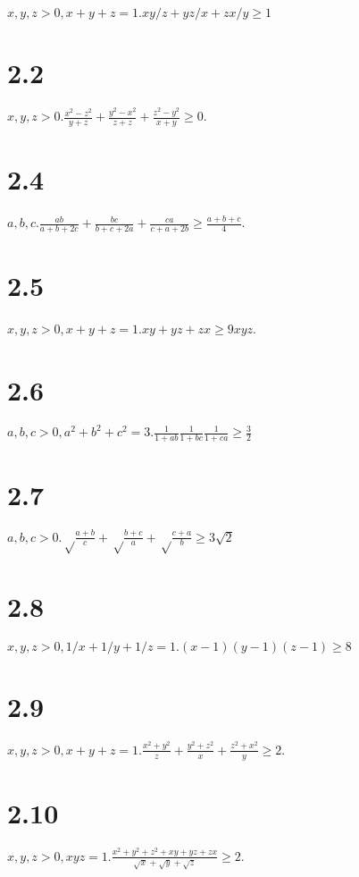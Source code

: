 \documentclass{article}
\begin{document}
$x, y, z > 0, x + y + z = 1. xy/z + yz/x + zx/y \ge 1$

\section*{2.2}

$x, y, z > 0. \frac{x^2 - z^2}{y + z} + \frac{y^2 - x^2}{z + z} + \frac{z^2 - y^2}{x + y} \ge 0$.

\section*{2.4}

$a, b, c. \frac{ab}{a + b + 2c} + \frac{bc}{b + c + 2a} + \frac{ca}{c + a + 2b} \ge \frac{a+b+c}{4}$.

\section*{2.5}

$x, y, z > 0, x + y + z = 1. xy + yz + zx \ge 9xyz$.

\section*{2.6}

$a, b, c > 0, a^2 + b^2 + c^2 = 3. \frac{1}{1 + ab} \frac{1}{1 + bc} \frac{1}{1 + ca} \ge \frac{3}{2}$

\section*{2.7}

$a, b, c > 0. \sqrt\frac{a+b}{c} + \sqrt\frac{b+c}{a} + \sqrt\frac{c+a}{b} \ge 3\sqrt 2$

\section*{2.8}

$x, y, z > 0, 1/x + 1/y + 1/z = 1. (x-1)(y-1)(z-1) \ge 8$

\section*{2.9}

$x, y, z > 0, x + y + z = 1. \frac{x^2 + y^2}{z} + \frac{y^2 + z^2}{x} + \frac{z^2 + x^2}{y} \ge 2$.

\section*{2.10}

$x, y, z > 0, xyz = 1. \frac{x^2 + y^2 + z^2 + xy + yz + zx}{\sqrt{x}+\sqrt{y}+\sqrt{z}} \ge 2$.
\end{document}
